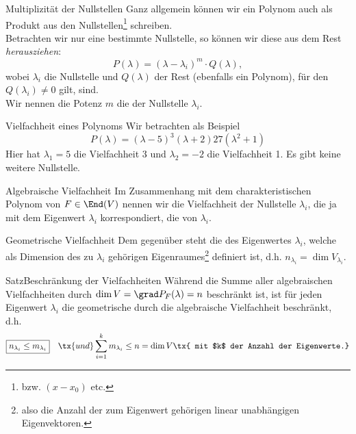\begin{Def}
{Multiplizität der Nullstellen}
Ganz allgemein können wir ein Polynom auch als Produkt aus den Nullstellen\footnote{bzw. $(x-x_0)$ etc.} schreiben.\\
Betrachten wir nur eine bestimmte Nullstelle, so können wir diese aus dem Rest \textit{herausziehen}:
\begin{equation*}
P(\lambda)=(\lambda-\lambda_i)^m\cdot Q(\lambda),
\end{equation*}
wobei $\lambda_i$ die Nullstelle und $Q(\lambda)$ der Rest (ebenfalls ein Polynom), für den $Q(\lambda_i)\neq 0$ gilt, sind.\\
Wir nennen die Potenz $m$ die  der Nullstelle $\lambda_i$.
\end{Def}

\begin{Beispiel}{Vielfachheit eines Polynoms}
Wir betrachten als Beispiel
\begin{equation*}
P(\lambda)=(\lambda-5)^3(\lambda+2)27(\lambda^2+1)
\end{equation*}
Hier hat $\lambda_1=5$ die Vielfachheit 3 und $\lambda_2=-2$ die Vielfachheit 1. Es gibt keine weitere Nullstelle.
\end{Beispiel}

\begin{Def}
{Algebraische Vielfachheit}
Im Zusammenhang mit dem charakteristischen Polynom von $F\in\End(V)$ nennen wir die Vielfachheit der Nullstelle $\lambda_i$, die ja mit dem Eigenwert $\lambda_i$ korrespondiert, die  von $\lambda_i$.
\end{Def}

\begin{Def}
{Geometrische Vielfachheit}
Dem gegenüber steht die  des Eigenwertes $\lambda_i$, welche als Dimension des zu $\lambda_i$ gehörigen Eigenraumes\footnote{also die Anzahl der zum Eigenwert gehörigen linear unabhängigen Eigenvektoren.} definiert ist, d.h. $n_{\lambda_i}=\dim V_{\lambda_i}$.
\end{Def}

\begin{Satz}{Satz}{Beschränkung der Vielfachheiten}
Während die Summe aller algebraischen Vielfachheiten durch $\dim V=\grad P_F(\lambda)=n$ beschränkt ist, ist für jeden Eigenwert $\lambda_i$ die geometrische durch die algebraische Vielfachheit beschränkt, d.h.
\begin{equation}
\boxed{n_{\lambda_i}\leq m_{\lambda_i}}\quad \tx{und }\sum_{i=1}^km_{\lambda_i}\leq n=\dim V\tx{ mit $k$ der Anzahl der Eigenwerte.}
\end{equation}
\end{Satz}

